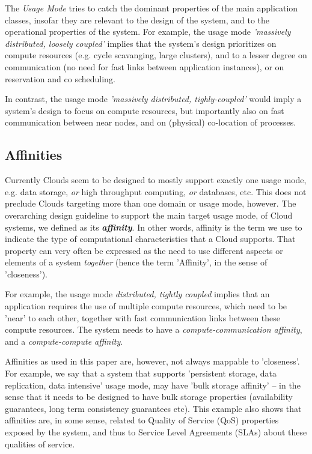 \documentclass{article}
\newcommand{\I}[1]{\textit{#1}}
\newcommand{\BI}[1]{\textbf{\textit{#1}}}
\begin{document}
  The \I{Usage Mode} tries to catch the dominant
  properties of the main application classes, insofar they are
  relevant to the design of the system, and to the operational
  properties of the system.  For example, the usage mode \I{'massively
  distributed, loosely coupled'} implies that the system's design
  prioritizes on compute resources (e.g. cycle scavanging, large
  clusters), and to a lesser degree on communication (no need for fast
  links between application instances), or on reservation and co
  scheduling.

  In contrast, the usage mode \I{'massively distributed,
    tighly-coupled'} would imply a system's design to focus on compute
  resources, but importantly also on fast communication between near
  nodes, and on (physical) co-location of processes.


 \subsection{Affinities}

  Currently Clouds seem to be designed to mostly support exactly one
  usage mode, e.g.  data storage, \I{or} high throughput computing,
  \I{or} databases, etc.  This does not preclude Clouds targeting more
  than one domain or usage mode, however.  The overarching design
  guideline to support the main target usage mode, of Cloud systems,
  we defined as its \BI{affinity}.  In other words, affinity is the
  term we use to indicate the type of computational characteristics
  that a Cloud supports.  That property can very often be expressed as
  the need to use different aspects or elements of a system
  \I{together} (hence the term 'Affinity', in the sense of
  'closeness').  

  For example, the usage mode \I{distributed, tightly coupled}
  implies that an application requires the use of multiple compute
  resources, which need to be 'near' to each other, together with fast
  communication links between these compute resources.  The system
  needs to have a \I{compute-communication affinity}, and a
  \I{compute-compute affinity}.

  Affinities as used in this paper are, however, not always mappable
  to 'closeness'.  For example, we say that a system that supports
  'persistent storage, data replication, data intensive' usage mode,
  may have 'bulk storage affinity' -- in the sense that it needs to be
  designed to have bulk storage properties (availability guarantees,
  long term consistency guarantees etc).  This example also shows that
  affinities are, in some sense, related to Quality of Service (QoS)
  properties exposed by the system, and thus to Service Level
  Agreements (SLAs) about these qualities of service.
\end{document}
